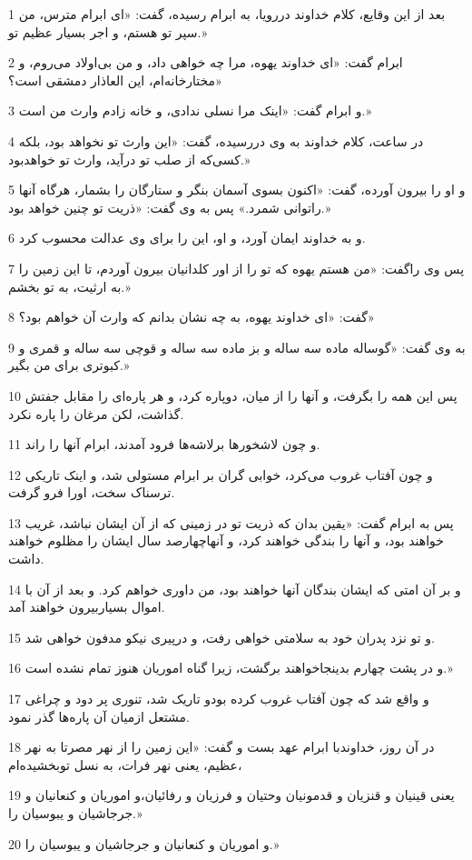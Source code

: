 \par 1 بعد از این وقایع، کلام خداوند دررویا، به ابرام رسیده، گفت: «ای ابرام مترس، من سپر تو هستم، و اجر بسیار عظیم تو.»
\par 2 ابرام گفت: «ای خداوند یهوه، مرا چه خواهی داد، و من بی‌اولاد می‌روم، و مختارخانه‌ام، این العاذار دمشقی است؟»
\par 3 و ابرام گفت: «اینک مرا نسلی ندادی، و خانه زادم وارث من است.»
\par 4 در ساعت، کلام خداوند به وی دررسیده، گفت: «این وارث تو نخواهد بود، بلکه کسی‌که از صلب تو درآید، وارث تو خواهدبود.»
\par 5 و او را بیرون آورده، گفت: «اکنون بسوی آسمان بنگر و ستارگان را بشمار، هرگاه آنها راتوانی شمرد.» پس به وی گفت: «ذریت تو چنین خواهد بود.»
\par 6 و به خداوند ایمان آورد، و او، این را برای وی عدالت محسوب کرد.
\par 7 پس وی راگفت: «من هستم یهوه که تو را از اور کلدانیان بیرون آوردم، تا این زمین را به ارثیت، به تو بخشم.»
\par 8 گفت: «ای خداوند یهوه، به چه نشان بدانم که وارث آن خواهم بود؟»
\par 9 به وی گفت: «گوساله ماده سه ساله و بز ماده سه ساله و قوچی سه ساله و قمری و کبوتری برای من بگیر.»
\par 10 پس این همه را بگرفت، و آنها را از میان، دوپاره کرد، و هر پاره‌ای را مقابل جفتش گذاشت، لکن مرغان را پاره نکرد.
\par 11 و چون لاشخورها برلاشه‌ها فرود آمدند، ابرام آنها را راند.
\par 12 و چون آفتاب غروب می‌کرد، خوابی گران بر ابرام مستولی شد، و اینک تاریکی ترسناک سخت، اورا فرو گرفت.
\par 13 پس به ابرام گفت: «یقین بدان که ذریت تو در زمینی که از آن ایشان نباشد، غریب خواهند بود، و آنها را بندگی خواهند کرد، و آنهاچهارصد سال ایشان را مظلوم خواهند داشت.
\par 14 و بر آن امتی که ایشان بندگان آنها خواهند بود، من داوری خواهم کرد. و بعد از آن با اموال بسیاربیرون خواهند آمد.
\par 15 و تو نزد پدران خود به سلامتی خواهی رفت، و در‌پیری نیکو مدفون خواهی شد.
\par 16 و در پشت چهارم بدینجاخواهند برگشت، زیرا گناه اموریان هنوز تمام نشده است.»
\par 17 و واقع شد که چون آفتاب غروب کرده بودو تاریک شد، تنوری پر دود و چراغی مشتعل ازمیان آن پاره‌ها گذر نمود.
\par 18 در آن روز، خداوندبا ابرام عهد بست و گفت: «این زمین را از نهر مصرتا به نهر عظیم، یعنی نهر فرات، به نسل توبخشیده‌ام،
\par 19 یعنی قینیان و قنزیان و قدمونیان وحتیان و فرزیان و رفائیان،و اموریان و کنعانیان و جرجاشیان و یبوسیان را.»
\par 20 و اموریان و کنعانیان و جرجاشیان و یبوسیان را.»
 

